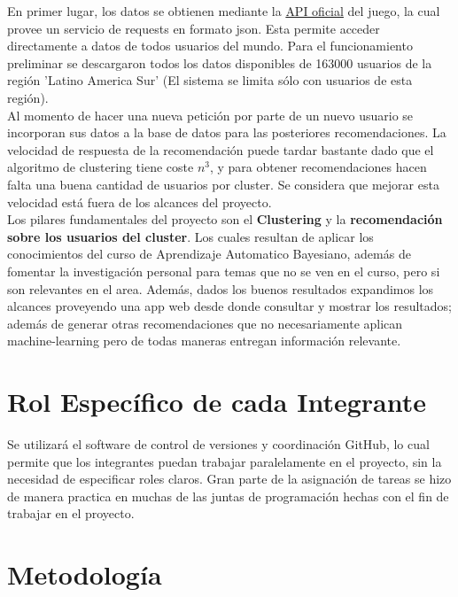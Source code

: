 \documentclass[letterpaper,11pt, spanish]{article}
\begin{document}
En primer lugar, los datos se obtienen mediante la \href{https://developer.riotgames.com/}{API oficial}
del juego, la cual provee un servicio de requests en formato json. Esta permite
acceder directamente a datos de todos usuarios del mundo. Para el funcionamiento preliminar se descargaron todos los datos disponibles de 163000 usuarios de la región 'Latino America Sur' (El sistema se limita sólo con usuarios de esta región). \\

Al momento de hacer una nueva petición por parte de un nuevo usuario se incorporan sus datos a la base de datos para las posteriores recomendaciones. La velocidad de respuesta de la recomendación puede tardar bastante dado que el algoritmo de clustering tiene coste $n^3$, y para obtener recomendaciones hacen falta una buena cantidad de usuarios por cluster. Se considera que mejorar esta velocidad está fuera de los alcances del proyecto. \\

Los pilares fundamentales del proyecto son el \textbf{Clustering} y la \textbf{recomendación sobre los usuarios del cluster}. Los cuales resultan de aplicar los conocimientos del curso de Aprendizaje Automatico Bayesiano, además de fomentar la investigación personal para temas que no se ven en el curso, pero si son relevantes en el area. Además, dados los buenos resultados expandimos los alcances proveyendo una app web desde donde consultar y mostrar los resultados; además de generar otras recomendaciones que no necesariamente aplican machine-learning pero de todas maneras entregan información relevante. 

\newpage
\section{Rol Específico de cada Integrante}

Se utilizará el software de control de versiones y coordinación GitHub, lo cual
permite que los integrantes puedan trabajar paralelamente en el proyecto, sin
la necesidad de especificar roles claros. Gran parte de la asignación de tareas se hizo de manera practica en muchas de las juntas de programación hechas con el fin de trabajar en el proyecto.\\

\section{Metodología}
\end{document}
